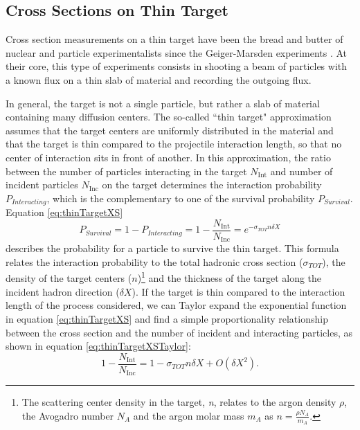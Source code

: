 \subsection{Cross Sections on Thin Target}
Cross section measurements on a thin target have been the bread and butter of nuclear and particle experimentalists since the Geiger-Marsden experiments \cite{Geiger1909}. At their core, this type of experiments consists in shooting a beam of particles with a known flux on a thin slab of material and recording the outgoing flux. 


In general, the target is not a single particle, but rather a slab of material containing many diffusion centers. The so-called  ``thin target" approximation assumes that the target centers are uniformly distributed in the material and that the target is thin compared to the projectile interaction length, so that no center of interaction sits in front of another. In this approximation, the ratio between the number of particles interacting in the target $N_{\text{Int}}$ and number of incident particles $N_{\text{Inc}}$ on the target determines the interaction probability $P_{Interacting}$, which is the complementary to one of the survival probability $P_{Survival}$. 
Equation \ref{eq:thinTargetXS} 
\begin{equation}
P_{Survival} = 1- P_{Interacting} = 1 - \frac{N_{\text{Int}}}{N_{\text{Inc}}} = e^{-\sigma_{TOT} n \delta X}
\label{eq:thinTargetXS}
\end{equation}
describes the probability for a particle to survive the thin target. This formula relates  the interaction probability to the total hadronic cross section ($\sigma_{TOT}$), the density of the target centers ($n$)\footnote{The scattering center density in the target, {\emph{n}},  relates to the argon density $\rho$, the Avogadro number  $ N_{A} $ and the argon molar mass $m_A$ as $n=\frac{\rho N_{A} }{m_A}$.}    and  the thickness of the target  along the incident hadron direction ($\delta X$). If the target is thin compared to the interaction length of the process considered, we can Taylor expand the exponential function in equation \ref{eq:thinTargetXS} and find a simple proportionality relationship between the cross section and the number of incident and interacting particles, as shown in equation \ref{eq:thinTargetXSTaylor}:
\begin{equation}
1 - \frac{N_{\text{Int}}}{N_{\text{Inc}}} =  1 -\sigma_{TOT} n \delta X + O(\delta X^2).
\label{eq:thinTargetXSTaylor}
\end{equation}

